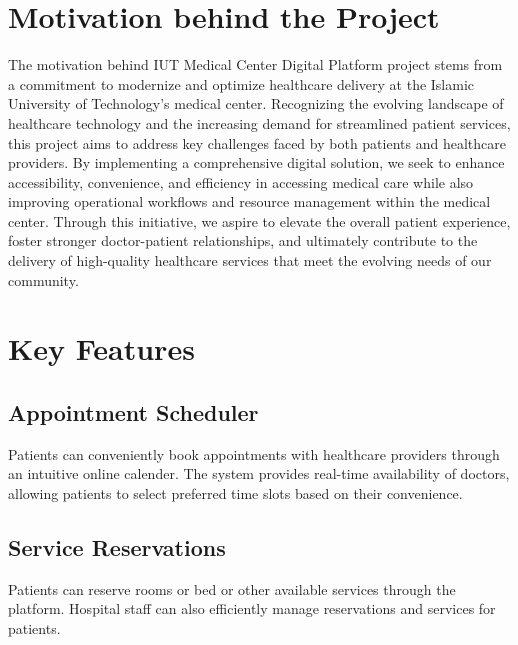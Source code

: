 \documentclass[11.5pt]{article}
\begin{document}
	
	
	\section{Motivation behind the Project}
	
	The motivation behind IUT Medical Center Digital Platform project stems from a commitment to modernize and optimize healthcare delivery at the Islamic University of Technology's medical center. Recognizing the evolving landscape of healthcare technology and the increasing demand for streamlined patient services, this project aims to address key challenges faced by both patients and healthcare providers. By implementing a comprehensive digital solution, we seek to enhance accessibility, convenience, and efficiency in accessing medical care while also improving operational workflows and resource management within the medical center. Through this initiative, we aspire to elevate the overall patient experience, foster stronger doctor-patient relationships, and ultimately contribute to the delivery of high-quality healthcare services that meet the evolving needs of our community.

	
	
	
	
	\section{Key Features}
	
	
	\subsection{Appointment Scheduler}
	
	Patients can conveniently book appointments with healthcare providers through an intuitive online calender. The system provides real-time availability of doctors, allowing patients to select preferred time slots based on their convenience.
	
	
	\subsection{Service Reservations}
	
	Patients can reserve rooms or bed or other available services through the platform. Hospital staff can also efficiently manage reservations and services for patients.
	
\end{document}
